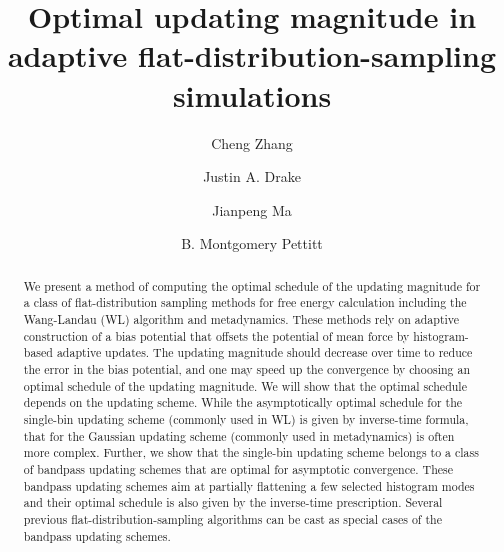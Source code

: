 \documentclass[reprint, superscriptaddress, floatfix]{revtex4-1}
\begin{document}
\title{Optimal updating magnitude in adaptive flat-distribution-sampling simulations}

\author{Cheng Zhang}
\author{Justin A. Drake}
\author{Jianpeng Ma}
\author{B. Montgomery Pettitt}



\begin{abstract}
  We present a method of computing the optimal schedule
  of the updating magnitude
  for a class of flat-distribution sampling methods
  for free energy calculation including
  the Wang-Landau (WL) algorithm and metadynamics.
  These methods rely on adaptive construction of
  a bias potential that offsets
  the potential of mean force by histogram-based adaptive updates.
  The updating magnitude should decrease over time
  to reduce the error in the bias potential,
  and one may speed up the convergence by choosing an optimal schedule
  of the updating magnitude.
  We will show that
  the optimal schedule depends on the updating scheme.
  While the asymptotically optimal schedule for
  the single-bin updating scheme (commonly used in WL)
  is given by inverse-time formula,
  that for the Gaussian updating scheme (commonly used in metadynamics)
  is often more complex.
  Further,
  we show that the single-bin updating scheme
  belongs to a class of bandpass updating schemes
  that are optimal for asymptotic convergence.
  These bandpass updating schemes aim at
  partially flattening a few selected histogram modes
  and their optimal schedule
  is also given by the inverse-time prescription.
  Several previous flat-distribution-sampling algorithms
  can be cast as special cases of the bandpass updating schemes.
\end{abstract}
\end{document}
